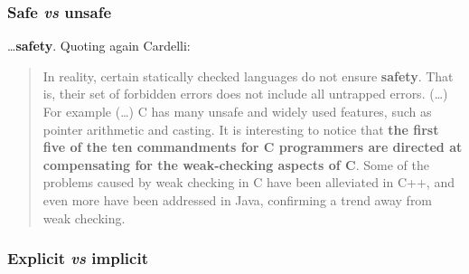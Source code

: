 \documentclass{beamer}
\begin{document}
\begin{frame}

    \frametitle{Safe \textit{vs} unsafe}

    \dots \textbf{safety}. Quoting again Cardelli:

    \begin{quotation}
    
        In reality, certain statically checked languages do not ensure
        \textbf{safety}. That is, their set of forbidden errors does not
        include all untrapped errors. (\dots) For example (\dots) C has
        many unsafe and widely used features, such as pointer arithmetic
        and casting. It is interesting to notice that \textbf{the first
        five of the ten commandments for C programmers are directed at
        compensating for the weak-checking aspects of C}.  Some of the
        problems caused by weak checking in C have been alleviated in C++,
        and even more have been addressed in Java, confirming a trend away
        from weak checking.
    
    \end{quotation}

\end{frame}

\begin{frame}

    \frametitle{Explicit \textit{vs} implicit}

    \begin{itemize}
    
    
    
    
    \end{itemize}

\end{frame}
\end{document}
